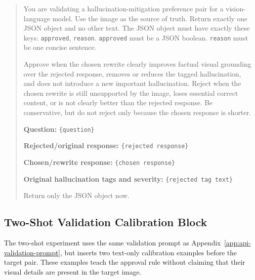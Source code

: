 \documentclass{article}
\begin{document}
\begin{quote}
\small
You are validating a hallucination-mitigation preference pair for a vision-language model. Use the image as the source of truth. Return exactly one JSON object and no other text. The JSON object must have exactly these keys: \texttt{approved}, \texttt{reason}. \texttt{approved} must be a JSON boolean. \texttt{reason} must be one concise sentence.

Approve when the chosen rewrite clearly improves factual visual grounding over the rejected response, removes or reduces the tagged hallucination, and does not introduce a new important hallucination. Reject when the chosen rewrite is still unsupported by the image, loses essential correct content, or is not clearly better than the rejected response. Be conservative, but do not reject only because the chosen response is shorter.

\textbf{Question:}
\texttt{\{question\}}

\textbf{Rejected/original response:}
\texttt{\{rejected response\}}

\textbf{Chosen/rewrite response:}
\texttt{\{chosen response\}}

\textbf{Original hallucination tags and severity:}
\texttt{\{rejected tag text\}}

Return only the JSON object now.
\end{quote}

\subsection{Two-Shot Validation Calibration Block}
\label{app:two-shot-validation-prompt}

The two-shot experiment uses the same validation prompt as Appendix~\ref{app:api-validation-prompt}, but inserts two text-only calibration examples before the target pair. These examples teach the approval rule without claiming that their visual details are present in the target image.
\end{document}
